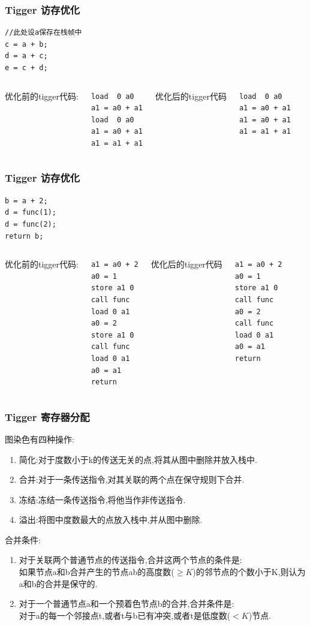 \documentclass{beamer}
\begin{document}
\begin{frame}[fragile]\frametitle{Tigger 访存优化}
\begin{lstlisting}
//此处设a保存在栈帧中
c = a + b;
d = a + c;
e = c + d;
\end{lstlisting}
\begin{columns}
优化前的tigger代码:
\begin{lstlisting}
load  0 a0
a1 = a0 + a1
load  0 a0
a1 = a0 + a1
a1 = a1 + a1
\end{lstlisting}
优化后的tigger代码
\begin{lstlisting}
load  0 a0
a1 = a0 + a1
a1 = a0 + a1
a1 = a1 + a1
\end{lstlisting}
\end{columns}

\end{frame}

\begin{frame}[fragile]\frametitle{Tigger 访存优化}
\begin{lstlisting}
b = a + 2;
d = func(1);
d = func(2);
return b;
\end{lstlisting}
\begin{columns}
优化前的tigger代码:
\begin{lstlisting}
a1 = a0 + 2
a0 = 1
store a1 0
call func
load 0 a1
a0 = 2
store a1 0
call func
load 0 a1
a0 = a1
return
\end{lstlisting}
优化后的tigger代码
\begin{lstlisting}
a1 = a0 + 2
a0 = 1
store a1 0
call func
a0 = 2
call func
load 0 a1
a0 = a1
return
\end{lstlisting}
\end{columns}
\end{frame}
\begin{frame}[fragile]\frametitle{Tigger 寄存器分配}
图染色有四种操作:
\begin{enumerate}[1.]
\item 简化:对于度数小于k的传送无关的点,将其从图中删除并放入栈中.
\item 合并:对于一条传送指令,对其关联的两个点在保守规则下合并.
\item 冻结:冻结一条传送指令,将他当作非传送指令.
\item 溢出:将图中度数最大的点放入栈中,并从图中删除.
\end{enumerate}
合并条件:
\begin{enumerate}
\item 对于关联两个普通节点的传送指令,合并这两个节点的条件是:\\如果节点a和b合并产生的节点ab的高度数($\ge K$)的邻节点的个数小于K,则认为a和b的合并是保守的.
\item 对于一个普通节点a和一个预着色节点b的合并,合并条件是:\\对于a的每一个邻接点t,或者t与b已有冲突,或者t是低度数($<K$)节点.
\end{enumerate}
\end{frame}
\end{document}
